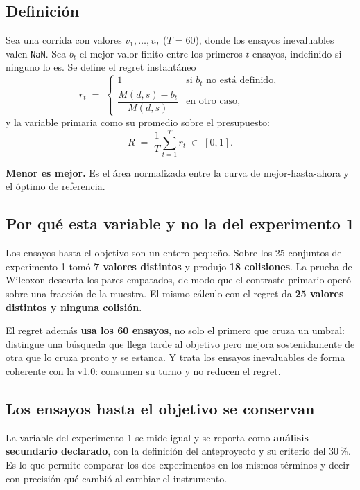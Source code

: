 \documentclass[11pt,letterpaper]{article}
\begin{document}
\subsection{Definición}

Sea una corrida con valores $v_1,\dots,v_T$ ($T=60$), donde los ensayos inevaluables
valen \texttt{NaN}. Sea $b_t$ el mejor valor finito entre los primeros $t$ ensayos,
indefinido si ninguno lo es. Se define el regret instantáneo
\[
  r_t \;=\;
  \begin{cases}
    1 & \text{si } b_t \text{ no está definido},\\[2pt]
    \dfrac{M(d,s) - b_t}{M(d,s)} & \text{en otro caso},
  \end{cases}
\]
y la variable primaria como su promedio sobre el presupuesto:
\[
  R \;=\; \frac{1}{T}\sum_{t=1}^{T} r_t \;\in\; [0,1].
\]

\textbf{Menor es mejor.} Es el área normalizada entre la curva de mejor-hasta-ahora y
el óptimo de referencia.

\subsection{Por qué esta variable y no la del experimento 1}

Los ensayos hasta el objetivo son un entero pequeño. Sobre los 25 conjuntos del
experimento 1 tomó \textbf{7 valores distintos} y produjo \textbf{18 colisiones}. La
prueba de Wilcoxon descarta los pares empatados, de modo que el contraste primario
operó sobre una fracción de la muestra. El mismo cálculo con el regret da
\textbf{25 valores distintos y ninguna colisión}.

El regret además \textbf{usa los 60 ensayos}, no solo el primero que cruza un umbral:
distingue una búsqueda que llega tarde al objetivo pero mejora sostenidamente de otra
que lo cruza pronto y se estanca. Y trata los ensayos inevaluables de forma coherente
con la v1.0: consumen su turno y no reducen el regret.

\subsection{Los ensayos hasta el objetivo se conservan}

La variable del experimento 1 se mide igual y se reporta como \textbf{análisis
secundario declarado}, con la definición del anteproyecto y su criterio del 30\,\%.
Es lo que permite comparar los dos experimentos en los mismos términos y decir con
precisión qué cambió al cambiar el instrumento.
\end{document}
